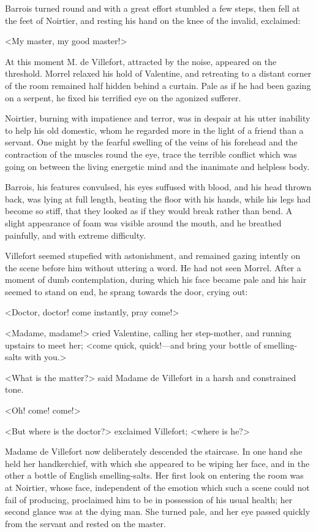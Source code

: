  Barrois turned round and with a great effort stumbled a few steps, then fell at the feet of Noirtier, and resting his hand on the knee of the invalid, exclaimed: 

 <My master, my good master!> 

 At this moment M. de Villefort, attracted by the noise, appeared on the threshold. Morrel relaxed his hold of Valentine, and retreating to a distant corner of the room remained half hidden behind a curtain. Pale as if he had been gazing on a serpent, he fixed his terrified eye on the agonized sufferer. 

 Noirtier, burning with impatience and terror, was in despair at his utter inability to help his old domestic, whom he regarded more in the light of a friend than a servant. One might by the fearful swelling of the veins of his forehead and the contraction of the muscles round the eye, trace the terrible conflict which was going on between the living energetic mind and the inanimate and helpless body. 

 Barrois, his features convulsed, his eyes suffused with blood, and his head thrown back, was lying at full length, beating the floor with his hands, while his legs had become so stiff, that they looked as if they would break rather than bend. A slight appearance of foam was visible around the mouth, and he breathed painfully, and with extreme difficulty. 

 Villefort seemed stupefied with astonishment, and remained gazing intently on the scene before him without uttering a word. He had not seen Morrel. After a moment of dumb contemplation, during which his face became pale and his hair seemed to stand on end, he sprang towards the door, crying out: 

 <Doctor, doctor! come instantly, pray come!> 

 <Madame, madame!> cried Valentine, calling her step-mother, and running upstairs to meet her; <come quick, quick!—and bring your bottle of smelling-salts with you.> 

 <What is the matter?> said Madame de Villefort in a harsh and constrained tone. 

 <Oh! come! come!> 

 <But where is the doctor?> exclaimed Villefort; <where is he?> 

 Madame de Villefort now deliberately descended the staircase. In one hand she held her handkerchief, with which she appeared to be wiping her face, and in the other a bottle of English smelling-salts. Her first look on entering the room was at Noirtier, whose face, independent of the emotion which such a scene could not fail of producing, proclaimed him to be in possession of his usual health; her second glance was at the dying man. She turned pale, and her eye passed quickly from the servant and rested on the master. 

